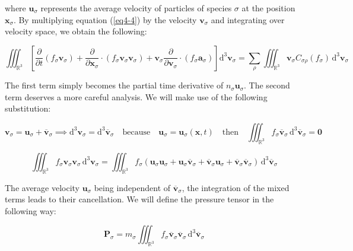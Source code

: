 where $\mathbf{u}_\sigma$ represents the average velocity of particles of species $\sigma$ at the position $\mathbf{x}_\sigma$. By multiplying equation (\ref{eq4-4}) by the velocity $\mathbf{v}_\sigma$ and integrating over velocity space, we obtain the following:

\begin{equation}
    \label{eq4-14}
    \iiint_{\mathbb{R}^3}\left[\frac{\partial}{\partial t}(f_\sigma\mathbf{v}_\sigma)+\frac{\partial}{\partial\mathbf{x}_\sigma}\cdot(f_\sigma\mathbf{v}_\sigma\mathbf{v}_\sigma)+\mathbf{v}_\sigma\frac{\partial}{\partial \mathbf{v}_\sigma}\cdot\left(f_\sigma\mathbf{a}_\sigma\right)\right]\mathrm{d}^3\mathbf{v}_\sigma=\sum_\rho\iiint_{\mathbb{R}^3}\mathbf{v}_\sigma C_{\sigma\rho}(f_\sigma)\,\mathrm{d}^3\mathbf{v}_\sigma
\end{equation}

The first term simply becomes the partial time derivative of $n_\sigma\mathbf{u}_\sigma$. The second term deserves a more careful analysis. We will make use of the following substitution:

\begin{equation}
    \label{eq4-15}
    \mathbf{v}_\sigma=\mathbf{u}_\sigma+\overline{\mathbf{v}}_\sigma\implies\mathrm{d}^3\mathbf{v}_\sigma=\mathrm{d}^3\overline{\mathbf{v}}_\sigma\quad\text{because}\quad\mathbf{u}_\sigma=\mathbf{u}_\sigma(\mathbf{x},t)\quad\text{then}\quad\iiint_{\mathbb{R}^3}f_\sigma\overline{\mathbf{v}}_\sigma\,\mathrm{d}^3\overline{\mathbf{v}}_\sigma=\mathbf{0}
\end{equation}

\begin{equation}
    \iiint_{\mathbb{R}^3}f_\sigma\mathbf{v}_\sigma\mathbf{v}_\sigma\,\mathrm{d}^3\mathbf{v}_\sigma=\iiint_{\mathbb{R}^3}f_\sigma\left(\mathbf{u}_\sigma\mathbf{u}_\sigma+\mathbf{u}_\sigma\overline{\mathbf{v}}_\sigma+\overline{\mathbf{v}}_\sigma\mathbf{u}_\sigma+\overline{\mathbf{v}}_\sigma\overline{\mathbf{v}}_\sigma\right)\,\mathrm{d}^3\overline{\mathbf{v}}_\sigma
\end{equation}

The average velocity $\mathbf{u}_\sigma$ being independent of $\overline{\mathbf{v}}_\sigma$, the integration of the mixed terms leads to their cancellation. We will define the pressure tensor in the following way:

\begin{equation}
    \mathbf{P}_\sigma=m_\sigma\iiint_{\mathbb{R}^3}f_\sigma\overline{\mathbf{v}}_\sigma\overline{\mathbf{v}}_\sigma\,\mathrm{d}^3\overline{\mathbf{v}}_\sigma
\end{equation}

